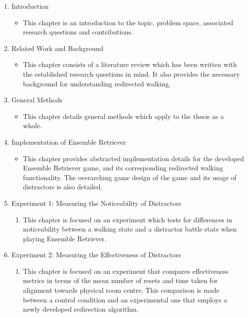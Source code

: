 \begin{enumerate}
    \item Introduction
    \begin{itemize}
        \item This chapter is an introduction to the topic, problem space, associated research questions and contributions.
    \end{itemize}
    \item Related Work and Background
    \begin{itemize}
        \item This chapter consists of a literature review which has been written with the established research questions in mind. It also provides the necessary background for understanding redirected walking.
    \end{itemize}
    \item General Methods
    \begin{itemize}
        \item This chapter details general methods which apply to the thesis as a whole.
    \end{itemize}
    \item Implementation of Ensemble Retriever
    \begin{itemize}
        \item This chapter provides abstracted implementation details for the developed Ensemble Retriever game, and its corresponding redirected walking functionality. The overarching game design of the game and its usage of distractors is also detailed.
    \end{itemize}
    \item Experiment 1: Measuring the Noticeability of Distractors
    \begin{enumerate}
        \item This chapter is focused on an experiment which tests for differences in noticeability between a walking state and a distractor battle state when playing Ensemble Retriever. 
    \end{enumerate}
    \item Experiment 2: Measuring the Effectiveness of Distractors
    \begin{enumerate}
        \item This chapter is focused on an experiment that compares effectiveness metrics in terms of the mean number of resets and time taken for alignment towards physical room centre. This comparison is made between a control condition and an experimental one that employs a newly developed redirection algorithm. 

\end{enumerate}
\end{enumerate}
